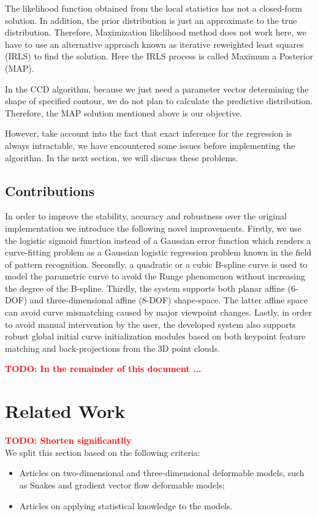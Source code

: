 \documentclass[conference]{IEEEtran}
\newcommand{\todo}[1]{\textbf{\textcolor{red}{TODO: #1}}}
\begin{document}
The likelihood function obtained from the local statistics has
not a closed-form solution. In addition, the prior distribution is just
an approximate to the true distribution. Therefore, Maximization
likelihood method does not work here, we have to use an alternative
approach known as iterative reweighted least squares (IRLS) to find
the solution. Here the IRLS process is called Maximum a Posterior (MAP).

In the CCD algorithm, because we just need a parameter vector determining
the shape of specified contour, we do not plan to calculate the
predictive distribution. Therefore, the MAP solution mentioned above
is our objective.

However, take account into the fact that exact inference for the
regression is always intractable, we have encountered some issues before
implementing the algorithm. In the next section, we will discuss these
problems.

\subsection{Contributions}
In order to improve the stability, accuracy and robustness over the original
implementation we introduce the following novel improvements. Firstly, we use the logistic sigmoid
function instead of a Gaussian error function which renders a
curve-fitting problem as a Gaussian logistic regression problem known in the
field of pattern recognition. Secondly, a quadratic or
a cubic B-spline curve is used to model the parametric curve
to avoid the Runge phenomenon without increasing the degree of the
B-spline. Thirdly, the system supports both planar affine (6-DOF) and
three-dimensional affine (8-DOF) shape-space. The latter affine space can avoid
curve mismatching caused by major viewpoint changes. Lastly, in
order to avoid manual intervention by the user, the developed system
also supports robust global initial curve initialization modules based on both keypoint
feature matching and back-projections from the 3D point clouds.

\todo{In the remainder of this document ...}
\section{Related Work}
\todo{Shorten significantlly}\\
We split this section based on the following criteria:
\begin{itemize}
\item Articles on two-dimensional and three-dimensional deformable models,
  such as Snakes and gradient vector flow deformable models;
\item Articles on applying statistical knowledge to the models.
\end{itemize}
\end{document}
